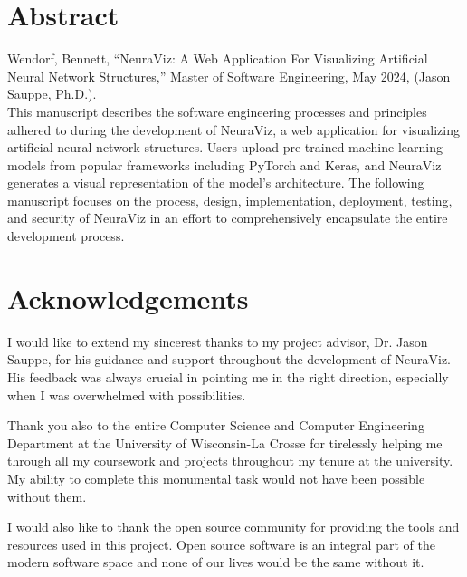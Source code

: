 \documentclass[letterpaper,12pt]{report}
\begin{document}
\hypersetup{pageanchor=false}
	
\clearpage


\clearpage

\hypersetup{pageanchor=true}
\setcounter{page}{1}
\renewcommand\arraystretch{1.5}

\section*{Abstract}
Wendorf, Bennett, ``NeuraViz: A Web Application For Visualizing Artificial Neural Network Structures,'' Master of Software Engineering, May 2024, (Jason Sauppe, Ph.D.). \\

This manuscript describes the software engineering processes and principles adhered to during the development of NeuraViz, a web application for visualizing artificial neural network structures. Users upload pre-trained machine learning models from popular frameworks including PyTorch and Keras, and NeuraViz generates a visual representation of the model's architecture. The following manuscript focuses on the process, design, implementation, deployment, testing, and security of NeuraViz in an effort to comprehensively encapsulate the entire development process.
\clearpage

\section*{Acknowledgements}
I would like to extend my sincerest thanks to my project advisor, Dr. Jason Sauppe, for his guidance and support throughout the development of NeuraViz. His feedback was always crucial in pointing me in the right direction, especially when I was overwhelmed with possibilities. 

Thank you also to the entire Computer Science and Computer Engineering Department at the University of Wisconsin-La Crosse for tirelessly helping me through all my coursework and projects throughout my tenure at the university. My ability to complete this monumental task would not have been possible without them.

I would also like to thank the open source community for providing the tools and resources used in this project. Open source software is an integral part of the modern software space and none of our lives would be the same without it.
\end{document}
